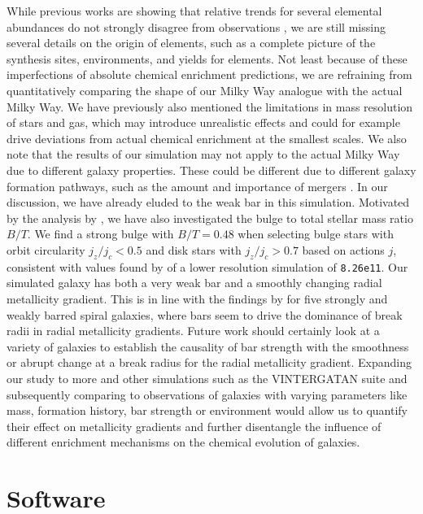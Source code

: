 \documentclass[twocolumn,apj,numberedappendix,appendixfloats,twocolappendix]{openjournal}
\begin{document}
\begin{CJK*}{UTF8}{gbsn}
While previous works are showing that relative trends for several elemental abundances do not strongly disagree from observations \citep{Buck2021, Buder2024}, we are still missing several details on the origin of elements, such as a complete picture of the synthesis sites, environments, and yields for elements. Not least because of these imperfections of absolute chemical enrichment predictions, we are refraining from quantitatively comparing the shape of our Milky Way analogue with the actual Milky Way. We have previously also mentioned the limitations in mass resolution of stars and gas, which may introduce unrealistic effects and could for example drive deviations from actual chemical enrichment at the smallest scales. We also note that the results of our simulation may not apply to the actual Milky Way due to different galaxy properties. These could be different due to different galaxy formation pathways, such as the amount and importance of mergers \citep{Buck2023, Buder2024}. In our discussion, we have already eluded to the weak bar in this simulation. Motivated by the analysis by \citet{Tuntipong2024}, we have also investigated the bulge to total stellar mass ratio $B/T$. We find a strong bulge with $B/T = 0.48$ when selecting bulge stars with orbit circularity $j_z/j_c < 0.5$ and disk stars with $j_z/j_c > 0.7$ based on actions $j$, consistent with values found by \citet{Obreja2019} of a lower resolution simulation of \texttt{8.26e11}. Our simulated galaxy has both a very weak bar and a smoothly changing radial metallicity gradient. This is in line with the findings by \citet{Chen2023} for five strongly and weakly barred spiral galaxies, where bars seem to drive the dominance of break radii in radial metallicity gradients. Future work should certainly look at a variety of galaxies to establish the causality of bar strength with the smoothness or abrupt change at a break radius for the radial metallicity gradient. Expanding our study to more and other simulations such as the \textsc{VINTERGATAN} suite \citep{Renaud2024} and subsequently comparing to observations of galaxies with varying parameters like mass, formation history, bar strength or environment would allow us to quantify their effect on metallicity gradients and further disentangle the influence of different enrichment mechanisms on the chemical evolution of galaxies.

\newpage
\section*{Software}


\end{CJK*}
\end{document}
